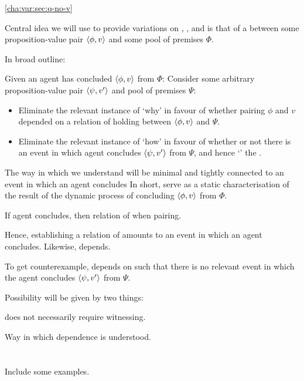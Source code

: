 \begin{note}
  \autoref{cha:var:sec:q-no-v}
\end{note}

\begin{note}
  Central idea we will use to provide variations on \qWhy{}, \qHow{}, and \issueInclusion{} is that of a \ros{} between some proposition-value pair \(\langle \phi, v \rangle\) and some pool of premises \(\Phi\).

  In broad outline:

  Given an agent has concluded \(\langle \phi, v \rangle\) from \(\Phi\):
  Consider some arbitrary proposition-value pair \(\langle \psi, v' \rangle\) and pool of premises \(\Psi\):
  \begin{itemize}
  \item
    Eliminate the relevant instance of `why' in favour of whether pairing \(\phi\) and \(v\) depended on a relation of \support{} holding between \(\langle \phi, v \rangle\) and \(\Psi\).
  \item
    Eliminate the relevant instance of `how' in favour of whether or not there is an event in which agent concludes \(\langle \psi, v' \rangle\) from \(\Psi\), and hence `' the \ros{}.
  \end{itemize}


  The way in which we understand  will be minimal and  tightly connected to an event in which an agent concludes
  In short, serve as a static characterisation of the result of the dynamic process of concluding \(\langle \phi, v \rangle\) from \(\Phi\).

 If agent concludes, then relation of \support{} when pairing.

  Hence, establishing a relation of \support{} amounts to an event in which an agent concludes.
  Likewise, depends.

  To get counterexample, depends on \ros{} such that there is no relevant event in which the agent concludes \(\langle \psi, v' \rangle\) from \(\Psi\).

  Possibility will be given by two things:

  \ros{} does not necessarily require witnessing.

  Way in which dependence is understood.
\end{note}


\section{}
\label{cha:var:support}

{
  \color{red} Include some examples.
}

